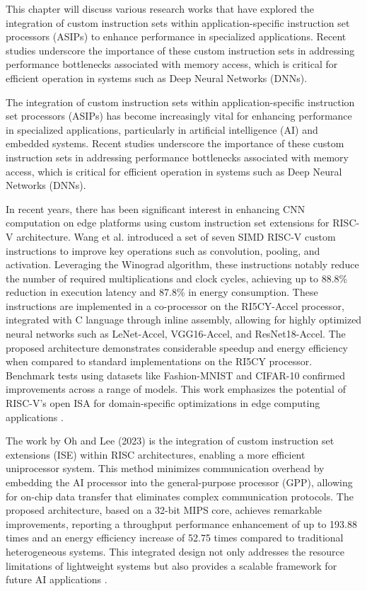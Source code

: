 This chapter will discuss various research works that have explored the integration of custom instruction sets within application-specific instruction set processors (ASIPs) to enhance performance in specialized applications. Recent studies underscore the importance of these custom instruction sets in addressing performance bottlenecks associated with memory access, which is critical for efficient operation in systems such as Deep Neural Networks (DNNs).

The integration of custom instruction sets within application-specific instruction set processors (ASIPs) has become increasingly vital for enhancing performance in specialized applications, particularly in artificial intelligence (AI) and embedded systems. Recent studies underscore the importance of these custom instruction sets in addressing performance bottlenecks associated with memory access, which is critical for efficient operation in systems such as Deep Neural Networks (DNNs).

In recent years, there has been significant interest in enhancing CNN computation on edge platforms using custom instruction set extensions for RISC-V architecture. Wang et al. introduced a set of seven SIMD RISC-V custom instructions to improve key operations such as convolution, pooling, and activation. Leveraging the Winograd algorithm, these instructions notably reduce the number of required multiplications and clock cycles, achieving up to 88.8\% reduction in execution latency and 87.8\% in energy consumption. These instructions are implemented in a co-processor on the RI5CY-Accel processor, integrated with C language through inline assembly, allowing for highly optimized neural networks such as LeNet-Accel, VGG16-Accel, and ResNet18-Accel. The proposed architecture demonstrates considerable speedup and energy efficiency when compared to standard implementations on the RI5CY processor. Benchmark tests using datasets like Fashion-MNIST and CIFAR-10 confirmed improvements across a range of models. This work emphasizes the potential of RISC-V's open ISA for domain-specific optimizations in edge computing applications \cite{wang2024optimizing}.


The work by Oh and Lee (2023) is the integration of custom instruction set extensions (ISE) within RISC architectures, enabling a more efficient uniprocessor system. This method minimizes communication overhead by embedding the AI processor into the general-purpose processor (GPP), allowing for on-chip data transfer that eliminates complex communication protocols. The proposed architecture, based on a 32-bit MIPS core, achieves remarkable improvements, reporting a throughput performance enhancement of up to 193.88 times and an energy efficiency increase of 52.75 times compared to traditional heterogeneous systems. This integrated design not only addresses the resource limitations of lightweight systems but also provides a scalable framework for future AI applications \cite{oh2023design}.


